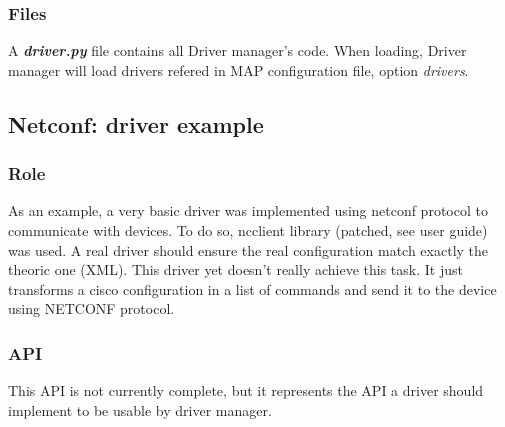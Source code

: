 \subsubsection{Files}
A \emph{\textbf{driver.py}} file contains all Driver manager's code. When loading, Driver manager will load drivers refered in MAP configuration file, option \emph{drivers}.

\subsection{Netconf: driver example}
\subsubsection{Role}
As an example, a very basic driver was implemented using netconf protocol to communicate with devices. To do so, ncclient library (patched, see user guide) was used. A real driver should ensure the real configuration match exactly the theoric one (XML). This driver yet doesn't really achieve this task. It just transforms a cisco configuration in a list of commands and send it to the device using NETCONF protocol.
\subsubsection{API}
This API is not currently complete, but it represents the API a driver should implement to be usable by driver manager.

